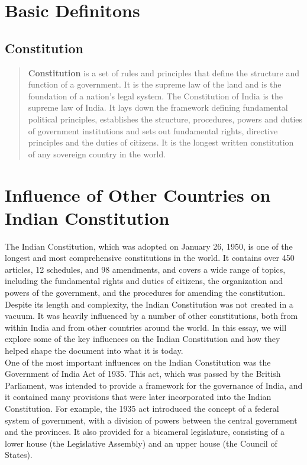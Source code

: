 \documentclass[11pt]{article}
\begin{document}
\tableofcontents
\thispagestyle{empty}
\clearpage

\setcounter{page}{1}

\section{Basic Definitons}
\subsection{Constitution}

\begin{quote}
	\textbf{Constitution} is a set of rules and principles that define the structure and function of a government. It is the supreme law of the land and is the foundation of a nation's legal system. The Constitution of India is the supreme law of India. It lays down the framework defining fundamental political principles, establishes the structure, procedures, powers and duties of government institutions and sets out fundamental rights, directive principles and the duties of citizens. It is the longest written constitution of any sovereign country in the world.
\end{quote}

\section{Influence of Other Countries on Indian Constitution}

The Indian Constitution, which was adopted on January 26, 1950, is one of the longest and most comprehensive constitutions in the world. It contains over 450 articles, 12 schedules, and 98 amendments, and covers a wide range of topics, including the fundamental rights and duties of citizens, the organization and powers of the government, and the procedures for amending the constitution.\\

Despite its length and complexity, the Indian Constitution was not created in a vacuum. It was heavily influenced by a number of other constitutions, both from within India and from other countries around the world. In this essay, we will explore some of the key influences on the Indian Constitution and how they helped shape the document into what it is today.\\

One of the most important influences on the Indian Constitution was the Government of India Act of 1935. This act, which was passed by the British Parliament, was intended to provide a framework for the governance of India, and it contained many provisions that were later incorporated into the Indian Constitution. For example, the 1935 act introduced the concept of a federal system of government, with a division of powers between the central government and the provinces. It also provided for a bicameral legislature, consisting of a lower house (the Legislative Assembly) and an upper house (the Council of States).\\
\end{document}
